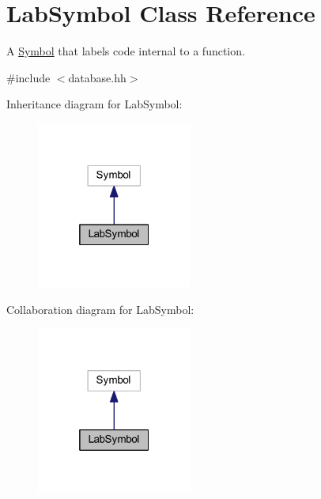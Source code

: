 \hypertarget{class_lab_symbol}{}\section{Lab\+Symbol Class Reference}
\label{class_lab_symbol}


A \mbox{\hyperlink{class_symbol}{Symbol}} that labels code internal to a function.  




{\ttfamily \#include $<$database.\+hh$>$}



Inheritance diagram for Lab\+Symbol\+:
\nopagebreak
\begin{figure}[H]
\begin{center}
\leavevmode
\includegraphics[width=145pt]{class_lab_symbol__inherit__graph}
\end{center}
\end{figure}


Collaboration diagram for Lab\+Symbol\+:
\nopagebreak
\begin{figure}[H]
\begin{center}
\leavevmode
\includegraphics[width=145pt]{class_lab_symbol__coll__graph}
\end{center}
\end{figure}
